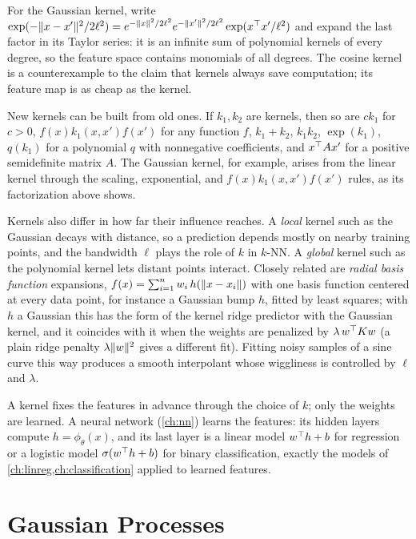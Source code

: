 For the Gaussian kernel, write $\exp(-\lVert x-x'\rVert^2/2\ell^2)=e^{-\lVert x\rVert^2/2\ell^2}e^{-\lVert x'\rVert^2/2\ell^2}\exp(x^{\top} x'/\ell^2)$ and expand the last factor in its Taylor series: it is an infinite sum of polynomial kernels of every degree, so the feature space contains monomials of all degrees. The cosine kernel is a counterexample to the claim that kernels always save computation; its feature map is as cheap as the kernel.

New kernels can be built from old ones. If $k_1,k_2$ are kernels, then so are $ck_1$ for $c>0$, $f(x)k_1(x,x')f(x')$ for any function $f$, $k_1+k_2$, $k_1k_2$, $\exp(k_1)$, $q(k_1)$ for a polynomial $q$ with nonnegative coefficients, and $x^{\top} Ax'$ for a positive semidefinite matrix $A$. The Gaussian kernel, for example, arises from the linear kernel through the scaling, exponential, and $f(x)k_1(x,x')f(x')$ rules, as its factorization above shows.

Kernels also differ in how far their influence reaches. A \emph{local} kernel such as the Gaussian decays with distance, so a prediction depends mostly on nearby training points, and the bandwidth $\ell$ plays the role of $k$ in $k$-NN. A \emph{global} kernel such as the polynomial kernel lets distant points interact. Closely related are \emph{radial basis function} expansions, $f(x)=\sum_{i=1}^nw_i\,h(\lVert x-x_i\rVert)$ with one basis function centered at every data point, for instance a Gaussian bump $h$, fitted by least squares; with $h$ a Gaussian this has the form of the kernel ridge predictor with the Gaussian kernel, and it coincides with it when the weights are penalized by $\lambda\,w^{\top} Kw$ (a plain ridge penalty $\lambda\lVert w\rVert^2$ gives a different fit). Fitting noisy samples of a sine curve this way produces a smooth interpolant whose wiggliness is controlled by $\ell$ and $\lambda$.

\begin{remark}\label{rem:kernel-vs-nn}
A kernel fixes the features in advance through the choice of $k$; only the weights are learned. A neural network (\cref{ch:nn}) learns the features: its hidden layers compute $h=\phi_\theta(x)$, and its last layer is a linear model $w^{\top} h+b$ for regression or a logistic model $\sigma(w^{\top} h+b)$ for binary classification, exactly the models of \cref{ch:linreg,ch:classification} applied to learned features.
\end{remark}

\section{Gaussian Processes}\label{sec:gp}

